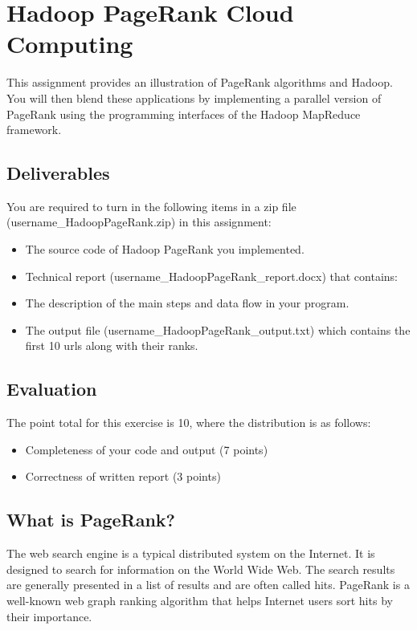 
\section*{Hadoop PageRank Cloud Computing}
 
This assignment provides an illustration of PageRank algorithms and Hadoop. You
will then blend these applications by implementing a parallel version of
PageRank using the programming interfaces of the Hadoop MapReduce framework. 


\subsection*{Deliverables}
You are required to turn in the following items in a zip file
(username\_HadoopPageRank.zip) in this assignment: 

\begin{itemize}
\item The source code of Hadoop PageRank you implemented.
\item Technical report (username\_HadoopPageRank\_report.docx) that contains: 
\item The description of the main steps and data flow in your program. 
\item The output file (username\_HadoopPageRank\_output.txt) which contains the
  first 10 urls along with their ranks. 

\end{itemize}

\subsection*{Evaluation}
The point total for this exercise is 10, where the distribution is as follows:
\begin{itemize}
\item Completeness of your code and output (7 points)
\item Correctness of written report (3 points)
\end{itemize}

\subsection*{What is PageRank?}
The web search engine is a typical distributed system on the Internet. It is
designed to search for information on the World Wide Web. The search results
are generally presented in a list of results and are often called hits.
PageRank is a well-known web graph ranking algorithm that helps Internet users
sort hits by their importance. 

